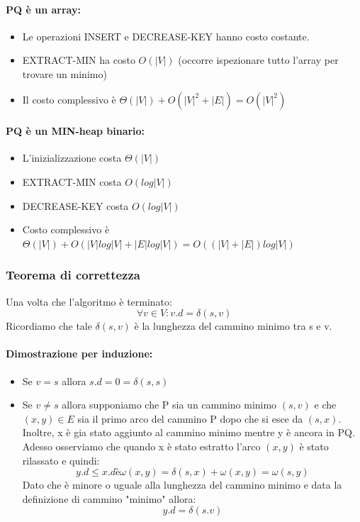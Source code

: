 \documentclass[a4paper,12pt]{article}
\begin{document}
\paragraph{PQ è un array:}
\begin{itemize}
    \item Le operazioni INSERT e DECREASE-KEY hanno costo costante.
    \item EXTRACT-MIN ha costo $O(|V|)$ (occorre ispezionare tutto l'array per trovare un minimo)
    \item Il costo complessivo è $\Theta(|V|) + O(|V|^2 + |E|) = O(|V|^2)$
\end{itemize}
\paragraph{PQ è un MIN-heap binario:}
\begin{itemize}
    \item L'inizializzazione costa $\Theta(|V|)$
    \item EXTRACT-MIN costa $O(log|V|)$
    \item DECREASE-KEY costa $O(log|V|)$
    \item Costo complessivo è $\Theta(|V|) + O(|V|log|V| + |E|log|V|) = O((|V| + |E|)log|V|)$
\end{itemize}

\subsubsection{Teorema di correttezza}
Una volta che l'algoritmo è terminato:
\[
\forall v \in V : v.d = \delta(s,v)
\]
Ricordiamo che tale $\delta(s,v)$ è la lunghezza del cammino minimo tra s e v.\\
\paragraph{Dimostrazione per induzione:}
\begin{itemize}
    \item Se $v = s$ allora $s.d = 0 = \delta(s,s)$
    \item Se $v \ne s$ allora supponiamo che P sia un cammino minimo $(s,v)$ e che $(x,y) \in E$ sia il primo arco del cammino P dopo che si esce da $(s,x)$. Inoltre, x è gia stato aggiunto al cammino minimo mentre y è ancora in PQ.\\
    Adesso osserviamo che quando x è stato estratto l'arco $(x,y)$ è stato rilassato e quindi:
    \[
    y.d \leq x.d è \omega(x,y) = \delta(s,x) + \omega(x,y) = \omega(s,y)
    \]
    Dato che è minore o uguale alla lunghezza del cammino minimo e data la definizione di cammino "minimo" allora:
    \[
    y.d = \delta(s.v)
    \]
\end{itemize}
\end{document}
